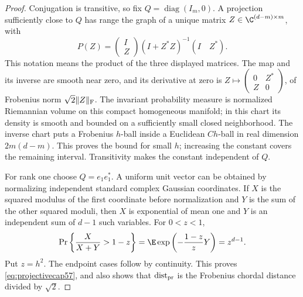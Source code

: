 \begin{proof}
Conjugation is transitive, so fix $Q=\operatorname{diag}(I_m,0)$. A projection sufficiently close to $Q$ has range the graph of a unique matrix $Z\in\C^{(d-m)\times m}$, with
\[
 P(Z)=\begin{pmatrix}I\\Z\end{pmatrix}(I+Z^*Z)^{-1}(I\quad Z^*).
\]
This notation means the product of the three displayed matrices. The map and its inverse are smooth near zero, and its derivative at zero is $Z\mapsto\left(\begin{smallmatrix}0&Z^*\\Z&0\end{smallmatrix}\right)$, of Frobenius norm $\sqrt2\|Z\|_{\rm F}$. The invariant probability measure is normalized Riemannian volume on this compact homogeneous manifold; in this chart its density is smooth and bounded on a sufficiently small closed neighborhood. The inverse chart puts a Frobenius $h$-ball inside a Euclidean $Ch$-ball in real dimension $2m(d-m)$. This proves the bound for small $h$; increasing the constant covers the remaining interval. Transitivity makes the constant independent of $Q$.

For rank one choose $Q=e_1e_1^*$. A uniform unit vector can be obtained by normalizing independent standard complex Gaussian coordinates. If $X$ is the squared modulus of the first coordinate before normalization and $Y$ is the sum of the other squared moduli, then $X$ is exponential of mean one and $Y$ is an independent sum of $d-1$ such variables. For $0<z<1$,
\[
 \Pr\left\{\frac{X}{X+Y}>1-z\right\}
 =\E\exp\left(-\frac{1-z}{z}Y\right)=z^{d-1}.
\]
Put $z=h^2$. The endpoint cases follow by continuity. This proves \eqref{eq:projectivecap57}, and also shows that $\operatorname{dist}_{\rm pr}$ is the Frobenius chordal distance divided by $\sqrt2$.
\end{proof}

